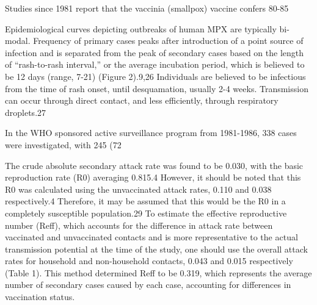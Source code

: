 Studies since 1981 report that the vaccinia (smallpox) vaccine confers 80-85%

Epidemiological curves depicting outbreaks of human MPX are typically bi-modal. Frequency of primary cases peaks after introduction of a point source of infection and is separated from the peak of secondary cases based on the length of “rash-to-rash interval,” or the average incubation period, which is believed to be 12 days (range, 7-21) (Figure 2).9,26 Individuals are believed to be infectious from the time of rash onset, until desquamation, usually 2-4 weeks. Transmission can occur through direct contact, and less efficiently, through respiratory droplets.27 

In the WHO sponsored active surveillance program from 1981-1986, 338 cases were investigated, with 245 (72%

The crude absolute  secondary attack rate was found to be 0.030, with the basic reproduction rate (R0) averaging 0.815.4 However, it should be noted that this R0 was calculated using the unvaccinated attack rates, 0.110 and 0.038 respectively.4 Therefore, it may be assumed that this would be the R0 in a completely susceptible population.29 To estimate the effective reproductive number (Reff), which accounts for the difference in attack rate between vaccinated and unvaccinated contacts and is more representative to the actual transmission potential at the time of the study, one should use the overall attack rates for household and non-household contacts, 0.043 and 0.015 respectively (Table 1). This method determined Reff to be 0.319, which represents the average number of secondary cases caused by each case, accounting for differences in vaccination status. 


